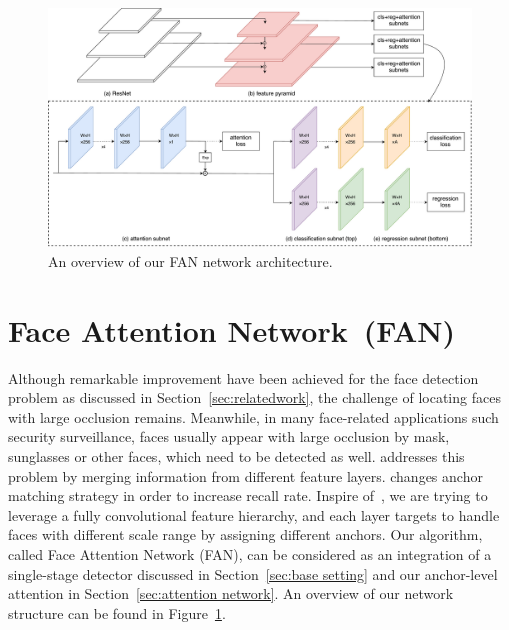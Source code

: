 \documentclass[10pt,twocolumn,letterpaper]{article}
\begin{document}
\begin{figure}[h]
\begin{center}
    \includegraphics[width=0.75\linewidth]{architecture.pdf}
\end{center}
    \caption{An overview of our FAN network architecture.}
\label{fig:architecture}
\end{figure}

\section{Face Attention Network~(FAN)}
Although remarkable improvement have been achieved for the face detection problem as discussed in Section~\ref{sec:relatedwork}, the challenge of locating faces with large occlusion remains. Meanwhile, in many face-related applications such security surveillance, faces usually appear with large occlusion by mask, sunglasses or other faces, which need to be detected as well. \cite{najibi2017ssh} addresses this problem by merging information from different feature layers. \cite{zhang2017s3fd} changes anchor matching strategy in order to increase recall rate. Inspire of~\cite{dollar2014fast}, we are trying to leverage a fully convolutional feature hierarchy, and each layer targets to handle faces with different scale range by assigning different anchors. Our algorithm, called Face Attention Network (FAN), can be considered as an integration of a single-stage detector discussed in Section~\ref{sec:base setting} and our anchor-level attention in Section~\ref{sec:attention network}. An overview of our network structure can be found in Figure~\ref{fig:architecture}.

\end{document}
